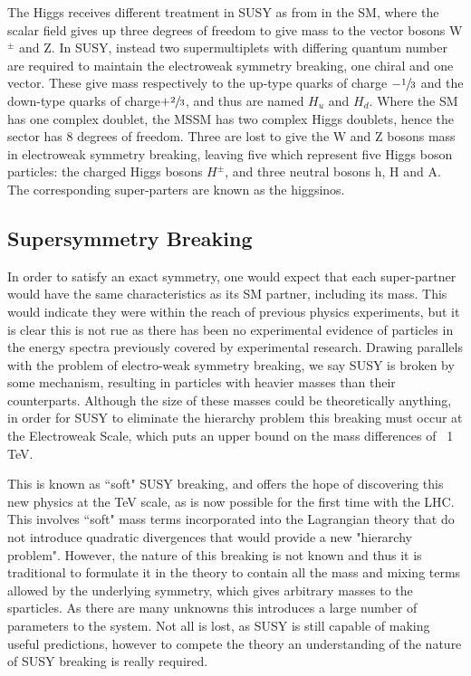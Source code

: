 The Higgs receives different treatment in SUSY as from in the SM, where the scalar field gives up three degrees of freedom to give mass to the vector bosons W$^{\pm}$ and Z. In SUSY, instead two supermultiplets with differing quantum number are required to maintain the electroweak symmetry breaking, one chiral and one vector. These give mass respectively to the up-type quarks of charge $-\sfrac{1}{3}$ and the down-type quarks of charge$+\sfrac{2}{3}$, and thus are named $H_{u}$ and $H_{d}$\cite{SUSYsuch}. Where the SM has one complex doublet, the MSSM has two complex Higgs doublets, hence the sector has 8 degrees of freedom. Three are lost to give the W and Z bosons mass in electroweak symmetry breaking, leaving five which represent five Higgs boson particles: the charged Higgs bosons $H^{\pm}$, and three neutral bosons h, H and A. The corresponding super-parters are known as the higgsinos.  


\subsection{Supersymmetry Breaking}

In order to satisfy an exact symmetry, one would expect that each super-partner would have the same characteristics as its SM partner, including its mass. This would indicate they were within the reach of previous physics experiments, but it is clear this is not rue as there has been no experimental evidence of particles in the energy spectra previously covered by experimental research. Drawing parallels with the problem of electro-weak symmetry breaking, we say SUSY is broken by some mechanism, resulting in particles with heavier masses than their counterparts. Although the size of these masses could be theoretically anything, in order for SUSY to eliminate the hierarchy problem this breaking must occur at the Electroweak Scale, which puts an upper bound on the mass differences of ~1 TeV.  

This is known as ``soft" SUSY breaking, and offers the hope of discovering this new physics at the TeV scale, as is now possible for the first time with the LHC. This involves ``soft" mass terms incorporated into the Lagrangian theory that do not introduce quadratic divergences that would provide a new "hierarchy problem". However, the nature of this breaking is not known and thus it is traditional to formulate it in the theory to contain all the mass and mixing terms allowed by the underlying symmetry, which gives arbitrary masses to the sparticles. As there are many unknowns this introduces a large number of parameters to the system. Not all is lost, as SUSY is still capable of making useful predictions, however to compete the theory an understanding of the nature of SUSY breaking is really required. 

